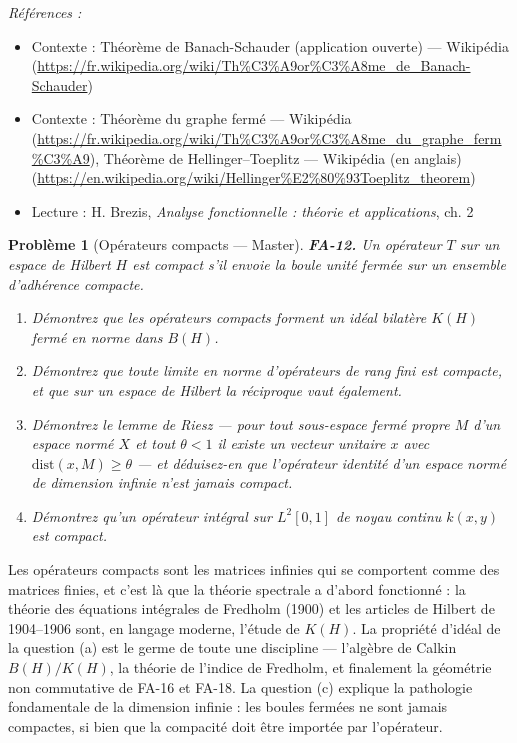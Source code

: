 \documentclass[11pt]{article}
\newtheorem{problem}{Problème}
\newenvironment{refs}{\par\small\noindent\emph{Références :}\begin{itemize}\setlength\itemsep{0pt}}{\end{itemize}\normalsize}
\begin{document}
\begin{refs}
\item Contexte : Théorème de Banach-Schauder (application ouverte) --- Wikipédia (\url{https://fr.wikipedia.org/wiki/Th%C3%A9or%C3%A8me_de_Banach-Schauder})
\item Contexte : Théorème du graphe fermé --- Wikipédia (\url{https://fr.wikipedia.org/wiki/Th%C3%A9or%C3%A8me_du_graphe_ferm%C3%A9}), Théorème de Hellinger--Toeplitz --- Wikipédia (en anglais) (\url{https://en.wikipedia.org/wiki/Hellinger%E2%80%93Toeplitz_theorem})
\item Lecture : H. Brezis, \textit{Analyse fonctionnelle : théorie et applications}, ch. 2
\end{refs}

\bigskip

\begin{problem}[{Opérateurs compacts --- Master}]
\textbf{FA-12.} Un opérateur $ T $ sur un espace de Hilbert $ H $ est
\textit{compact} s'il envoie la boule unité fermée sur un ensemble d'adhérence compacte.
\begin{enumerate}
\item[(a)] Démontrez que les opérateurs compacts forment un idéal bilatère $ K(H) $ fermé en norme dans
$ B(H) $.
\item[(b)] Démontrez que toute limite en norme d'opérateurs de rang fini est compacte, et que sur un espace
de Hilbert la réciproque vaut également.
\item[(c)] Démontrez le lemme de Riesz --- pour tout sous-espace fermé propre $ M $ d'un espace normé
$ X $ et tout $ \theta < 1 $ il existe un vecteur unitaire $ x $ avec
$ \mathrm{dist}(x, M) \ge \theta $ --- et déduisez-en que l'opérateur identité d'un espace normé de
dimension infinie n'est jamais compact.
\item[(d)] Démontrez qu'un opérateur intégral sur $ L^2[0,1] $ de noyau continu $ k(x,y) $ est
compact.
\end{enumerate}

\end{problem}

\noindent Les opérateurs compacts sont les matrices infinies qui se comportent comme des
matrices finies, et c'est là que la théorie spectrale a d'abord fonctionné : la théorie des équations
intégrales de Fredholm (1900) et les articles de Hilbert de 1904--1906 sont, en langage moderne, l'étude
de $ K(H) $. La propriété d'idéal de la question (a) est le germe de toute une discipline --- l'algèbre
de Calkin $ B(H)/K(H) $, la théorie de l'indice de Fredholm, et finalement la géométrie non commutative
de FA-16 et FA-18. La question (c) explique la pathologie fondamentale de la dimension infinie : les
boules fermées ne sont jamais compactes, si bien que la compacité doit être importée par l'opérateur.
\end{document}
